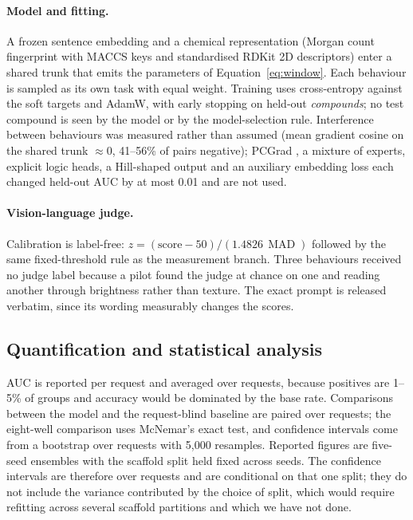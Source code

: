 \documentclass[11pt]{article}
\begin{document}
\paragraph{Model and fitting.} A frozen sentence embedding and a chemical representation
(Morgan count fingerprint \citep{rogers2010ecfp} with MACCS keys and standardised RDKit 2D
descriptors) enter a shared trunk that emits the parameters of Equation~\ref{eq:window}.
Each behaviour is sampled as its own task with equal weight. Training uses cross-entropy
against the soft targets and AdamW, with early stopping on held-out \emph{compounds}; no
test compound is seen by the model or by the model-selection rule. Interference between
behaviours was measured rather than assumed (mean gradient cosine on the shared trunk
$\approx 0$, 41--56\% of pairs negative); PCGrad \citep{yu2020pcgrad}, a mixture of experts,
explicit logic heads, a Hill-shaped output and an auxiliary embedding loss each changed
held-out AUC by at most 0.01 and are not used.

\paragraph{Vision-language judge.} Calibration is label-free:
$z = (\text{score} - 50)/(1.4826\,\operatorname{MAD})$ followed by the same fixed-threshold
rule as the measurement branch. Three behaviours received no judge label because a pilot
found the judge at chance on one and reading another through brightness rather than texture.
The exact prompt is released verbatim, since its wording measurably changes the scores.

\subsection*{Quantification and statistical analysis}

AUC is reported per request and averaged over requests, because positives are 1--5\% of
groups and accuracy would be dominated by the base rate. Comparisons between the model and
the request-blind baseline are paired over requests; the eight-well comparison uses
McNemar's exact test, and confidence intervals come from a bootstrap over requests with
5,000 resamples. Reported figures are five-seed ensembles with the scaffold split held
fixed across seeds. The confidence intervals are therefore over requests and are
conditional on that one split; they do not include the variance contributed by the choice
of split, which would require refitting across several scaffold partitions and which we
have not done.
\end{document}
